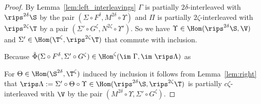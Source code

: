 \begin{proof}

  By Lemma~\ref{lem:left_interleavings} $\Gamma$ is partially $2\delta$-interleaved with $\rips^{2\delta}\S$ by the pair $(\Sigma\circ F^\delta, M^{2\delta}\circ\Upsilon)$ and $\Pi$ is partially $2\zeta$-interleaved with $\rips^{2\zeta}\T$ by a pair $(\Sigma'\circ G^\zeta, N^{2\zeta}\circ\Upsilon')$.
  So we have $\Upsilon\in\Hom(\rips^{2\delta}\S,\V)$ and $\Sigma'\in\Hom(\T^\zeta, \rips^{2\zeta}\T)$ that commute with inclusion.

  Because  $\tilde{\Phi}(\Sigma\circ F^{\delta}, \Sigma'\circ G^\zeta)\in\Hom^{\zeta}(\im~\Gamma, \im~\rips\Lambda)$ as 

  For $\Theta\in\Hom(\S^{2\delta},\T^\zeta)$ induced by inclusion it follows from Lemma~\ref{lem:right} that $\rips\Lambda :=\Sigma'\circ\Theta\circ\Upsilon\in\Hom(\rips^{2\delta}\S, \rips^{2\zeta}\T)$ is partially $c\zeta$-interleaved with $\V$ by the pair $(M^{2\delta}\circ \Upsilon, \Sigma'\circ G^{\zeta})$.

\end{proof}


